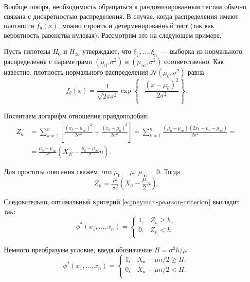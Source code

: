 Вообще говоря, необходимость обращаться к рандомизированным тестам обычно 
связана с дискретностью распределения. В случае, когда распределения имеют 
плотности \(f_{\theta}(x)\), можно строить и детерменированный тест (так как 
вероятность равенства нулевая). Рассмотрим это на следующем примере.
\begin{example}\label{example:normal-distribution-shift}
	Пусть гипотезы \(H_{0}\) и \(H_{\infty}\) утверждают, что \(\xi_{1}, 
	\ldots, \xi_{n}\)~--- выборка из нормального распределения 
	с параметрами \((\mu_{0}, \sigma^{2})\) и \((\mu_{\infty}, \sigma^{2})\) 
	соответственно. Как известно, плотность нормального распределения 
	\(\mathcal{N}(\mu_{\theta}, \sigma^{2})\) равна
	\[
		f_{\theta}(x) = \frac{1}{\sqrt{2\pi\sigma^{2}}}\exp\left\{-\frac{(x - 
		\mu_{\theta})^{2}}{2\sigma^{2}}\right\}.
	\]
	
	Посчитаем логарифм отношения правдоподобия:
	\begin{align*}
		Z_{n} &= \sum_{k = 1}^{n} \left[\frac{(x_{k} - \mu_{\infty})^{2}} 
		{2\sigma^{2}} - \frac{(x_{k} - \mu_{0})^{2}}{2\sigma^{2}}\right] = 
		\sum_{k = 1}^{n} \frac{(\mu_{0} - \mu_{\infty})(2x_{k} - \mu_{0} - 
		\mu_{\infty})}{2\sigma^{2}} = \\
		&= \frac{\mu_{0} - \mu_{\infty}}{\sigma^{2}}\left(X_{N} - \frac{\mu_{0} 
		- \mu_{\infty}}{2}n\right).
	\end{align*}
	
	Для простоты описания скажем, что \(\mu_{0} = \mu\), \(\mu_{\infty} = 0\). 
	Тогда
	\[
		Z_{n} = \frac{\mu}{\sigma^{2}}\left(X_{n} - \frac{\mu}{2}n\right).
	\]
	
	Следовательно, оптимальный критерий \eqref{eq:neyman-pearson-criterion} 
	выглядит так:
	\[
		\phi^{*}(x_{1}, \ldots, x_{n}) = 
		\begin{cases}
			1, & Z_{n} \geq h, \\
			0, & Z_{n} < h. \\
		\end{cases}
	\]
	
	Немного преобразуем условие, введя обозначение \(H = \sigma^{2}h/\mu\):
	\begin{equation}
		\phi^{*}(x_{1}, \ldots, x_{n}) = 
		\begin{cases}
		1, & X_{n} - \mu n/2 \geq H, \\
		0, & X_{n} - \mu n/2 < H. \\
		\end{cases}
	\end{equation}
	

\end{example}
